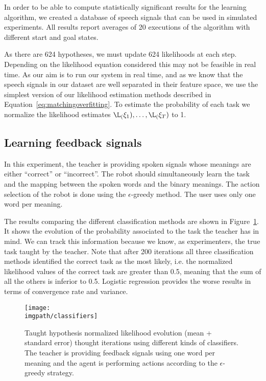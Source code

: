 In order to be able to compute statistically significant results for the learning algorithm, we created a database of speech signals that can be used in simulated experiments. All results report averages of 20 executions of the algorithm with different start and goal states. 

As there are 624 hypotheses, we must update 624 likelihoods at each step. Depending on the likelihood equation considered this may not be feasible in real time. As our aim is to run our system in real time, and as we know that the speech signals in our dataset are well separated in their feature space, we use the simplest version of our likelihood estimation methods described in Equation~\ref{eq:matchingoverfitting}. To estimate the probability of each task we normalize the likelihood estimates $\L_(\xi_1),\ldots,\L_(\xi_T)$ to 1.


\subsection{Learning feedback signals}

In this experiment, the teacher is providing spoken signals whose meanings are either ``correct'' or ``incorrect''. The robot should simultaneously learn the task and the mapping between the spoken words and the binary meanings. The action selection of the robot is done using the $\epsilon$-greedy method. The user uses only one word per meaning.

The results comparing the different classification methods are shown in Figure~\ref{fig:FeedbackOneWord}. It shows the evolution of the probability associated to the task the teacher has in mind. We can track this information because we know, as experimenters, the true task taught by the teacher. Note that after 200 iterations all three classification methods identified the correct task as the most likely, i.e. the normalized likelihood values of the correct task are greater than 0.5, meaning that the sum of all the others is inferior to 0.5. Logistic regression provides the worse results in terms of convergence rate and variance.

\begin{figure}[!htbp]
  \centering
  \texttt{[image: \\imgpath/classifiers]}
  \caption{Taught hypothesis normalized likelihood evolution (mean + standard error) thought iterations using different kinds of classifiers. The teacher is providing feedback signals using one word per meaning and the agent is performing actions according to the $\epsilon$-greedy strategy.}
  \label{fig:FeedbackOneWord}
\end{figure}

